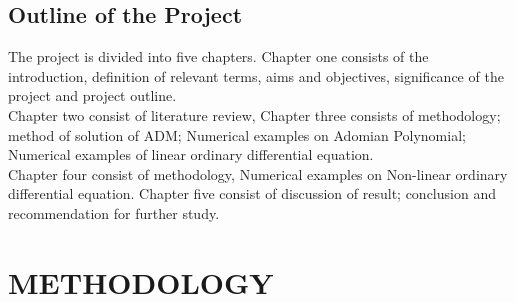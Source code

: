 \documentclass[11pt]{report}
\newcommand{\NI}{\noindent}
\begin{document}
	\section{Outline of the Project}
	The project is divided into five chapters. Chapter one consists of the introduction, definition of relevant terms, aims and objectives, significance of the project and project outline.\\
	
	\NI Chapter two consist of literature review, Chapter three consists of methodology; method of solution of ADM; Numerical examples on Adomian Polynomial; Numerical examples of linear ordinary differential equation.\\
	
	\NI Chapter four consist of methodology, Numerical examples on Non-linear ordinary differential equation. Chapter five consist of discussion of result; conclusion and recommendation for further study.
	
	
	
	
	
	
	
	
	
	\chapter{}
	\section{}
	
	
	
	
	
	
	\chapter{METHODOLOGY}
	\section{}
	
	
	
	
	
	\chapter{}
	
	
\end{document}
